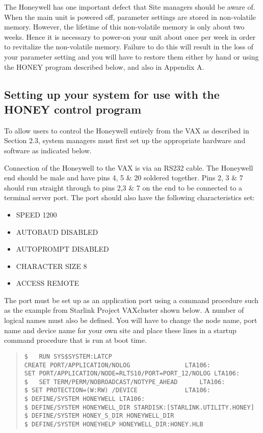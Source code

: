 The Honeywell has one important defect that Site managers should be aware
of. When the main unit is powered off, parameter settings are stored in
non-volatile memory. However, the lifetime of this non-volatile memory
is only about two weeks. Hence it is necessary to power-on your unit
about once per week in order to revitalize the non-volatile memory. Failure
to do this will result in the loss of your parameter setting and you will have
to restore them either by hand or using the HONEY program described below,
and also in Appendix A.

\subsection{Setting up your system for use with the HONEY control program}

To allow users to control the Honeywell entirely from the VAX as described in
Section 2.3, system managers must first set up the appropriate hardware and
software as indicated below.

Connection of the Honeywell to the VAX is via an RS232 cable. The Honeywell end should be male
and have pins 4, 5 \& 20 soldered together. Pins 2, 3 \& 7 should
run straight through to pins 2,3 \& 7 on the end to be connected
to a terminal server port.
The port should also have the following characteristics set:

\begin{itemize}

\item SPEED 1200

\item AUTOBAUD DISABLED

\item AUTOPROMPT DISABLED

\item CHARACTER SIZE 8

\item ACCESS REMOTE

\end{itemize}

The port must be set up as an application port using
a command procedure such as the example from Starlink Project VAXcluster
shown below. A number of logical names must also be defined.
You will have to change the
node name, port name and device name for your own site and place
these lines in a startup command procedure that is run at boot time.

\begin{quote}
\begin{verbatim}
$	RUN SYS$SYSTEM:LATCP
CREATE PORT/APPLICATION/NOLOG				LTA106:
SET PORT/APPLICATION/NODE=RLTS10/PORT=PORT_12/NOLOG	LTA106:
$	SET TERM/PERM/NOBROADCAST/NOTYPE_AHEAD 		LTA106:
$ SET PROTECTION=(W:RW) /DEVICE				LTA106:
$ DEFINE/SYSTEM HONEYWELL LTA106:
$ DEFINE/SYSTEM HONEYWELL_DIR STARDISK:[STARLINK.UTILITY.HONEY]
$ DEFINE/SYSTEM HONEY_S_DIR HONEYWELL_DIR
$ DEFINE/SYSTEM HONEYHELP HONEYWELL_DIR:HONEY.HLB
\end{verbatim}
\end{quote}

